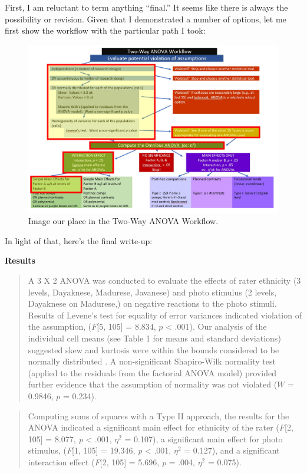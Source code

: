 \documentclass[
  11pt,
]{book}
\begin{document}
First, I am reluctant to term anything ``final.'' It seems like there is always the possibility or revision. Given that I demonstrated a number of options, let me first show the workflow with the particular path I took:

\begin{figure}
\centering
\includegraphics{images/factorial/WrkFlw_mypath.jpg}
\caption{Image our place in the Two-Way ANOVA Workflow.}
\end{figure}

In light of that, here's the final write-up:

\textbf{Results}

\begin{quote}
A 3 X 2 ANOVA was conducted to evaluate the effects of rater ethnicity (3 levels, Dayaknese, Madurese, Javanese) and photo stimulus (2 levels, Dayaknese on Madurese,) on negative reactions to the photo stimuli. Results of Levene's test for equality of error variances indicated violation of the assumption, (\(F\){[}5, 105{]} = 8.834, \(p\) \textless{} .001). Our analysis of the individual cell means (see Table 1 for means and standard deviations) suggested skew and kurtosis were within the bounds considered to be normally distributed \citep{kline_principles_2016}. A non-significant Shapiro-Wilk normality test (applied to the residuals from the factorial ANOVA model) provided further evidence that the assumption of normality was not violated (\(W\) = 0.9846, \(p\) = 0.234).
\end{quote}

\begin{quote}
Computing sums of squares with a Type II approach, the results for the ANOVA indicated a significant main effect for ethnicity of the rater (\emph{F}{[}2, 105{]} = 8.077, \emph{p} \textless{} .001, \(\eta ^{2}\) = 0.107), a significant main effect for photo stimulus, (\emph{F}{[}1, 105{]} = 19.346, \emph{p} \textless{} .001, \(\eta ^{2}\) = 0.127), and a significant interaction effect (\emph{F}{[}2, 105{]} = 5.696, \emph{p} = .004, \(\eta ^{2}\) = 0.075).
\end{quote}
\end{document}
